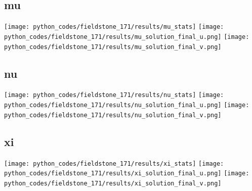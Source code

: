 \subsection*{mu}
\begin{center}
\texttt{[image: python\_codes/fieldstone\_171/results/mu\_stats]}
\texttt{[image: python\_codes/fieldstone\_171/results/mu\_solution\_final\_u.png]}
\texttt{[image: python\_codes/fieldstone\_171/results/mu\_solution\_final\_v.png]}
\end{center}

\subsection*{nu}
\begin{center}
\texttt{[image: python\_codes/fieldstone\_171/results/nu\_stats]}
\texttt{[image: python\_codes/fieldstone\_171/results/nu\_solution\_final\_u.png]}
\texttt{[image: python\_codes/fieldstone\_171/results/nu\_solution\_final\_v.png]}
\end{center}

\subsection*{xi}
\begin{center}
\texttt{[image: python\_codes/fieldstone\_171/results/xi\_stats]}
\texttt{[image: python\_codes/fieldstone\_171/results/xi\_solution\_final\_u.png]}
\texttt{[image: python\_codes/fieldstone\_171/results/xi\_solution\_final\_v.png]}
\end{center}

